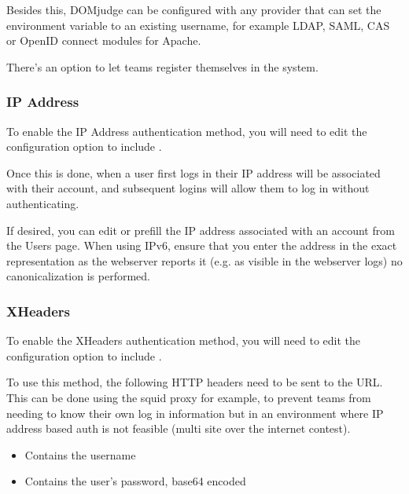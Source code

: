 \documentclass[a4paper,10pt,english,openany]{sphinxmanual}
\begin{document}
\sphinxAtStartPar
Besides this, DOMjudge can be configured with any provider that can set
the environment variable  to an existing username,
for example LDAP, SAML, CAS or OpenID connect modules for Apache.

\sphinxAtStartPar
There’s an option to let teams register themselves in the system.


\subsubsection{IP Address}
\label{\detokenize{config-advanced:ip-address}}
\sphinxAtStartPar
To enable the IP Address authentication method, you will need to edit
the configuration option  to include .

\sphinxAtStartPar
Once this is done, when a user first logs in their IP address will be
associated with their account, and subsequent logins will allow them to log
in without authenticating.

\sphinxAtStartPar
If desired, you can edit or pre\sphinxhyphen{}fill the IP address associated with an
account from the Users page. When using IPv6, ensure that you enter the
address in the exact representation as the webserver reports it (e.g.
as visible in the webserver logs) \sphinxhyphen{} no canonicalization is performed.


\subsubsection{X\sphinxhyphen{}Headers}
\label{\detokenize{config-advanced:x-headers}}
\sphinxAtStartPar
To enable the X\sphinxhyphen{}Headers authentication method, you will need to edit
the configuration option  to include .

\sphinxAtStartPar
To use this method, the following HTTP headers need to be sent to the
 URL. This can be done using the squid proxy for example, to
prevent teams from needing to know their own log in information but in an
environment where IP address based auth is not feasible (multi site over the
internet contest).
\begin{itemize}
\item {} 
\sphinxAtStartPar
{} \sphinxhyphen{} Contains the username

\item {} 
\sphinxAtStartPar
{}  \sphinxhyphen{} Contains the user’s password, base64 encoded

\end{itemize}
\end{document}
